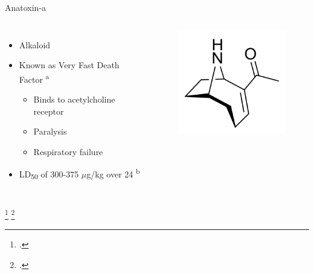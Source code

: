 \begin{frame}{Anatoxin-a}
\begin{columns}
	\begin{itemize}
		\item Alkaloid 
		\item Known as Very Fast Death Factor \textsuperscript{a}
			\begin{itemize}
				\item Binds to acetylcholine receptor
				\item Paralysis 
				\item Respiratory failure
			\end{itemize}
		\item LD\textsubscript{50} of 300-375 $\mu$g/kg over 24 \textsuperscript{b}
	\end{itemize}
	\begin{figure}
		\centering
		\includegraphics[width=2in]{anatoxin.png}
	\end{figure}
	\hspace*{-3cm}
\end{columns}
\footcitetext{[a], codd_cyanobacterial_1999}
\footcitetext{[b], shaw_cylindrospermopsin_2000}
\end{frame}
